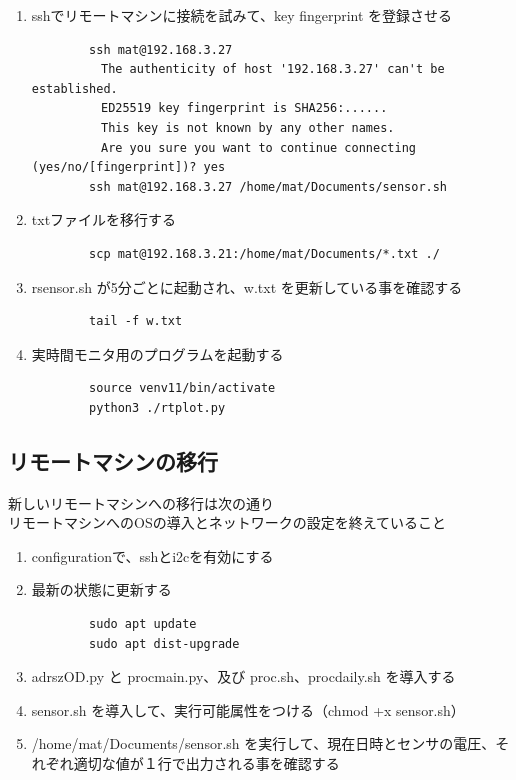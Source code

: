 \documentclass[12pt,a4paper,uplatex]{jsarticle}
\begin{document}
\begin{enumerate}
	\item sshでリモートマシンに接続を試みて、key fingerprint を登録させる
	\begin{verbatim}
		ssh mat@192.168.3.27
		　The authenticity of host '192.168.3.27' can't be established.
		　ED25519 key fingerprint is SHA256:......
		　This key is not known by any other names.
		　Are you sure you want to continue connecting (yes/no/[fingerprint])? yes
		ssh mat@192.168.3.27 /home/mat/Documents/sensor.sh
	\end{verbatim}
	\item txtファイルを移行する
	\begin{verbatim}
		scp mat@192.168.3.21:/home/mat/Documents/*.txt ./
	\end{verbatim}
	\item rsensor.sh が5分ごとに起動され、w.txt を更新している事を確認する
	\begin{verbatim}
		tail -f w.txt
	\end{verbatim}
	\item 実時間モニタ用のプログラムを起動する
	\begin{verbatim}
		source venv11/bin/activate
		python3 ./rtplot.py
	\end{verbatim}
\end{enumerate}

\subsection{リモートマシンの移行}

新しいリモートマシンへの移行は次の通り\\リモートマシンへのOSの導入とネットワークの設定を終えていること

\begin{enumerate}
	\item configurationで、sshとi2cを有効にする
	\item 最新の状態に更新する
	\begin{verbatim}
		sudo apt update
		sudo apt dist-upgrade
	\end{verbatim}
	\item adrszOD.py と procmain.py、及び proc.sh、procdaily.sh を導入する
	\item sensor.sh を導入して、実行可能属性をつける（chmod +x sensor.sh）
	\item /home/mat/Documents/sensor.sh を実行して、現在日時とセンサの電圧、それぞれ適切な値が１行で出力される事を確認する
\end{enumerate}
\end{document}
